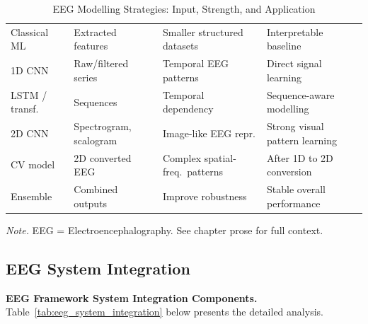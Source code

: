 {\tablestripes\tablefontsize

\begin{xltabular}{\textwidth}{@{} >{\raggedright\arraybackslash}p{2.0cm} >{\raggedright\arraybackslash}p{2.0cm} L L @{}}
\caption[EEG Modelling Strategies]{EEG Modelling Strategies: Input, Strength, and Application}\label{tab:eeg_modelling_strategies} \\
\toprule
{} &  &  &  \\
\midrule
\endfirsthead
\endhead
\bottomrule
\endlastfoot
Classical ML & Extracted features & Smaller structured datasets & Interpretable baseline \\
1D CNN & Raw/filtered series & Temporal EEG patterns & Direct signal learning \\
LSTM / transf. & Sequences & Temporal dependency & Sequence-aware modelling \\
2D CNN & Spectrogram, scalogram & Image-like EEG repr. & Strong visual pattern learning \\
CV model & 2D converted EEG & Complex spatial-freq.\ patterns & After 1D to 2D conversion \\
Ensemble & Combined outputs & Improve robustness & Stable overall performance \\
\end{xltabular}}
\vspace{0.3em}\noindent\textit{Note.} EEG = Electroencephalography. See chapter prose for full context.

\subsection{EEG System Integration}\label{sec:appendix_ch3_eeg_system_integration}

\noindent\textbf{EEG Framework System Integration Components.} Table~\ref{tab:eeg_system_integration} below presents the detailed analysis.


